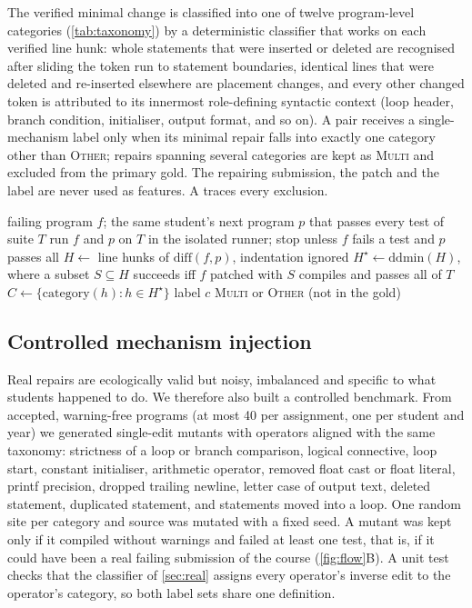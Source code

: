 \documentclass[a4paper,preprint,12pt,authoryear]{elsarticle}
\begin{document}
The verified minimal change is classified into one of twelve program-level categories (\cref{tab:taxonomy}) by a deterministic classifier that works on each verified line hunk: whole statements that were inserted or deleted are recognised after sliding the token run to statement boundaries, identical lines that were deleted and re-inserted elsewhere are placement changes, and every other changed token is attributed to its innermost role-defining syntactic context (loop header, branch condition, initialiser, output format, and so on). A pair receives a single-mechanism label only when its minimal repair falls into exactly one category other than \textsc{Other}; repairs spanning several categories are kept as \textsc{Multi} and excluded from the primary gold. The repairing submission, the patch and the label are never used as features. A traces every exclusion.

\begin{algorithm}[t]
\caption{Repair-grounded labelling of one repair event}\label{alg:label}
\begin{algorithmic}[1]
\Require failing program $f$; the same student's next program $p$ that passes every test of suite $T$
\State run $f$ and $p$ on $T$ in the isolated runner; stop unless $f$ fails a test and $p$ passes all 
\State $H \gets$ line hunks of $\mathrm{diff}(f, p)$, indentation ignored
\State $H^\star \gets \mathrm{ddmin}(H)$, where a subset $S \subseteq H$ succeeds iff $f$ patched with $S$ compiles and passes all of $T$
\State $C \gets \{\mathrm{category}(h) : h \in H^\star\}$ 
  \State \Return label $c$
\Else
  \State \Return \textsc{Multi} or \textsc{Other} (not in the gold)
\EndIf
\end{algorithmic}
\end{algorithm}

\subsection{Controlled mechanism injection}\label{sec:injected}
Real repairs are ecologically valid but noisy, imbalanced and specific to what students happened to do. We therefore also built a controlled benchmark. From accepted, warning-free programs (at most 40 per assignment, one per student and year) we generated single-edit mutants with operators aligned with the same taxonomy: strictness of a loop or branch comparison, logical connective, loop start, constant initialiser, arithmetic operator, removed float cast or float literal, printf precision, dropped trailing newline, letter case of output text, deleted statement, duplicated statement, and statements moved into a loop. One random site per category and source was mutated with a fixed seed. A mutant was kept only if it compiled without warnings and failed at least one test, that is, if it could have been a real failing submission of the course (\cref{fig:flow}B). A unit test checks that the classifier of \cref{sec:real} assigns every operator's inverse edit to the operator's category, so both label sets share one definition.
\end{document}

